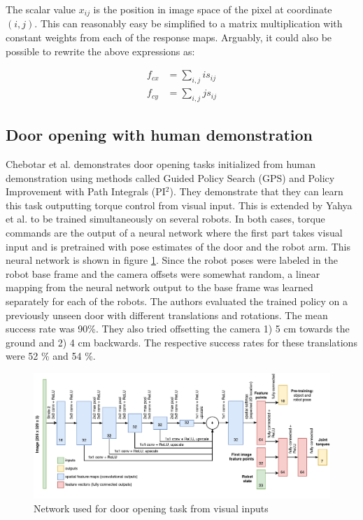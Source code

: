 The scalar value $x_{ij}$ is the position in image space of the pixel at coordinate
$(i, j)$. This can reasonably easy be simplified to a matrix multiplication with constant
weights from each of the response maps. Arguably, it could also be possible to rewrite the
above expressions as:

\begin{align}
    f_{cx} &= \sum_{i,j} i s_{ij} \\
    f_{cy} &= \sum_{i,j} j s_{ij}
\end{align}

\subsection{Door opening with human demonstration}

Chebotar et al. \cite{chebotar2016path} demonstrates door opening tasks
initialized from human demonstration using methods called Guided Policy Search
(GPS) and Policy Improvement with Path Integrals (PI$^2$). They demonstrate
that they can learn this task outputting torque control from visual input. This is
extended by Yahya et al. \cite{yahya2016collective} to be trained
simultaneously on several robots. In both cases, torque commands are the output
of a neural network where the first part takes visual input and is pretrained
with pose estimates of the door and the robot arm. This neural network is shown
in figure \ref{fig:gps_net}. Since the robot poses were labeled in the robot
base frame and the camera offsets were somewhat random, a linear mapping from
the neural network output to the base frame was learned separately for each of
the robots. The authors evaluated the trained policy on a previously unseen
door with different translations and rotations. The mean success rate was
90\%. They also tried offsetting the camera 1) 5 cm towards the ground and 2) 4
cm backwards. The respective success rates for these translations were 52 \%
and 54 \%.

\begin{figure}[h]
    \centering
    \includegraphics[width = 1.0\textwidth]{res/gps-net.pdf}
    \caption{Network used for door opening task from visual inputs \cite{chebotar2016path}}
    \label{fig:gps_net}
\end{figure}


